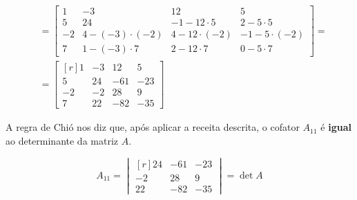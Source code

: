 \vspace{-30pt}

\begin{align*}
    &=\begin{bmatrix}
        1 & -3 & 12 & 5 \\
        5 & 24 & -1-12\cdot5 & 2-5\cdot5 \\
        -2 & 4-(-3)\cdot(-2) & 4-12\cdot(-2) & -1-5\cdot(-2) \\
        7 & 1-(-3)\cdot7 & 2-12\cdot7 & 0-5\cdot7
    \end{bmatrix}=\\
    &=\begin{bmatrix*}[r]
        1 & -3 & 12 & 5\\
        5 & 24 & -61 & -23\\
        -2 & -2 & 28 & 9\\
        7 & 22 & -82 & -35
    \end{bmatrix*}
\end{align*}

A regra de Chió nos diz que, após aplicar a receita descrita, o cofator $A_{11}$ é \textbf{igual} ao determinante da matriz $A$.

$$
A_{11}= \begin{vmatrix*}[r]
        24 & -61 & -23\\
        -2 & 28 & 9\\
        22 & -82 & -35
\end{vmatrix*} = \det A
$$
